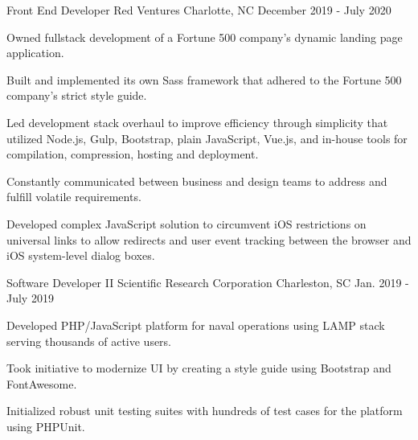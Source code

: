 \begin{cventries}

  \cventry
    {Front End Developer} %
    {Red Ventures} %
    {Charlotte, NC} %
    {December 2019 - July 2020} %
    {
      \begin{cvitems} %
        \item {Owned fullstack development of a Fortune 500 company's dynamic landing page application.}
        \item {Built and implemented its own Sass framework that adhered to the Fortune 500 company's strict style guide.}
        \item {Led development stack overhaul to improve efficiency through simplicity that utilized Node.js, Gulp, Bootstrap, plain JavaScript, Vue.js, and in-house tools for compilation, compression, hosting and deployment.}
        \item {Constantly communicated between business and design teams to address and fulfill volatile requirements.}
        \item {Developed complex JavaScript solution to circumvent iOS restrictions on universal links to allow redirects and user event tracking between the browser and iOS system-level dialog boxes.}
      \end{cvitems}
    }

  \cventry
    {Software Developer II} %
    {Scientific Research Corporation} %
    {Charleston, SC} %
    {Jan. 2019 - July 2019} %
    {
      \begin{cvitems} %
        \item {Developed PHP/JavaScript platform for naval operations using LAMP stack serving thousands of active users.}
        \item {Took initiative to modernize UI by creating a style guide using Bootstrap and FontAwesome.}
        \item {Initialized robust unit testing suites with hundreds of test cases for the platform using PHPUnit.}
      \end{cvitems}
    }


\end{cventries}
